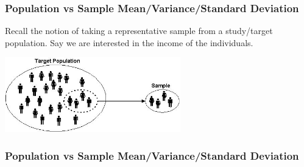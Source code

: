 \documentclass[handout]{beamer}
\newcommand{\blue}[1]{\textcolor{blue2}{#1}}
\begin{document}
\begin{frame}[fragile]
\frametitle{Population vs Sample Mean/Variance/Standard Deviation}

Recall the notion of taking a \blue{representative sample} from a \blue{study/target population}.  Say we are interested in the income of the individuals.   

\vspace{0.25cm}

\begin{center}
\includegraphics[width=3in]{figure/target-population.jpg} 
\end{center}


\end{frame}


\begin{frame}[fragile]
\frametitle{Population vs Sample Mean/Variance/Standard Deviation}


\end{frame}
\end{document}
